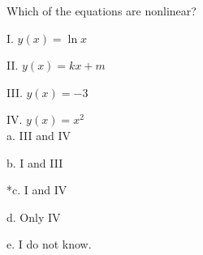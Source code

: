 
Which of the equations are nonlinear?

	I. $y(x) = \ln x$

	II.  $y(x) = kx + m$

	III.  $y(x) = -3$

	IV.  $y(x) = x^2$ \\

a. III and IV

b. I and III

*c. I and IV

d. Only IV

e. I do not know. \\
